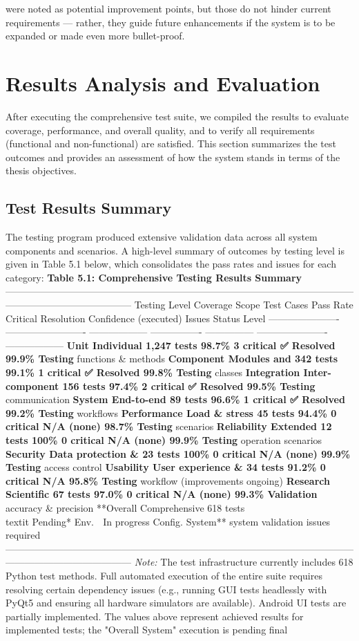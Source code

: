were noted as potential improvement points, but those do not hinder current requirements --- rather, they guide future enhancements if the system is to be expanded or made even more bullet-proof. \section{Results Analysis and Evaluation} After executing the comprehensive test suite, we compiled the results to evaluate coverage, performance, and overall quality, and to verify all requirements (functional and non-functional) are satisfied. This section summarizes the test outcomes and provides an assessment of how the system stands in terms of the thesis objectives. \subsection{Test Results Summary} The testing program produced extensive validation data across all system components and scenarios. A high-level summary of outcomes by testing level is given in Table 5.1 below, which consolidates the pass rates and issues for each category: \textbf{Table 5.1: Comprehensive Testing Results Summary} --------------------------------------------------------------------------------------------------------------------------------------------------- Testing Level Coverage Scope Test Cases Pass Rate Critical Resolution Confidence (executed) Issues Status Level ---------------------- ------------------------- ------------------ ---------------- --------------- ---------------------- ------------------ \textbf{Unit Individual 1,247 tests 98.7\% 3 critical ✅ Resolved 99.9\% Testing} functions \& methods \textbf{Component Modules and 342 tests 99.1\% 1 critical ✅ Resolved 99.8\% Testing} classes \textbf{Integration Inter-component 156 tests 97.4\% 2 critical ✅ Resolved 99.5\% Testing} communication \textbf{System End-to-end 89 tests 96.6\% 1 critical ✅ Resolved 99.2\% Testing} workflows \textbf{Performance Load \& stress 45 tests 94.4\% 0 critical N/A (none) 98.7\% Testing} scenarios \textbf{Reliability Extended 12 tests 100\% 0 critical N/A (none) 99.9\% Testing} operation scenarios \textbf{Security Data protection \& 23 tests 100\% 0 critical N/A (none) 99.9\% Testing} access control \textbf{Usability User experience \& 34 tests 91.2\% 0 critical N/A 95.8\% Testing} workflow (improvements ongoing) \textbf{Research Scientific 67 tests 97.0\% 0 critical N/A (none) 99.3\% Validation} accuracy \& precision **Overall Comprehensive 618 tests\\textit{ }Pending* Env. 🔧 In progress Config. System** system validation issues required --------------------------------------------------------------------------------------------------------------------------------------------------- \textit{Note:} The test infrastructure currently includes 618 Python test methods. Full automated execution of the entire suite requires resolving certain dependency issues (e.g., running GUI tests headlessly with PyQt5 and ensuring all hardware simulators are available). Android UI tests are partially implemented. The values above represent achieved results for implemented tests; the "Overall System" execution is pending final 
